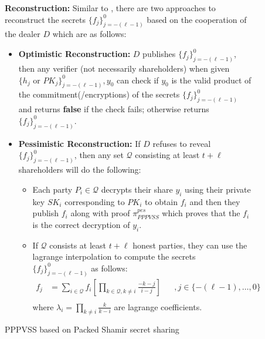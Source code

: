 \begin{figure}[ht]
{\begin{tcolorbox}[title=\textbf{PPPVSS based on Packed Shamir secret sharing \ref{sec:packed-shamir}}, width=1.2\textwidth, colframe=blue!75!black, colback=blue!10, sharp corners]
        \vspace{0.5em}
        \textbf{Reconstruction:}
            Similar to \cite{cryptoeprint:2025/576}, there are two approaches to reconstruct the secrets 
            $\{f_j\}_{j=-(\ell-1)}^0$ based on the cooperation of the dealer $D$ which are as follows:
            \begin{itemize}
                \item \textbf{Optimistic Reconstruction:} $D$ publishes $\{f_j\}_{j=-(\ell-1)}^0$, then any verifier (not necessarily shareholders) 
                when given $\{h_j\text{ or }PK_j\}_{j=-(\ell-1)}^0,y_0$ can check if $y_0$ is the valid product of the commitment(/encryptions) 
                of the secrets $\{f_j\}_{j=-(\ell-1)}^0$ and returns \textbf{false} if the check fails; otherwise returns 
                $\{f_j\}_{j=-(\ell-1)}^0$.
                \item \textbf{Pessimistic Reconstruction:} If $D$ refuses to reveal $\{f_j\}_{j=-(\ell-1)}^0$, then any set 
                $\mathcal{Q}$ consisting at least $t+\ell$ shareholders will do the following:
                \begin{itemize}
                    \item Each party $P_i\in\mathcal{Q}$ decrypts their share $y_i$ using their private key $SK_i$ 
                      corresponding to $PK_i$ to obtain $f_i$ and then they publish $f_i$ 
                      along with proof $\pi_{PPPVSS}^{pes}$ which proves that the $f_i$ is the correct 
                      decryption of $y_i$.
                    \item If $\mathcal{Q}$ consists at least $t+\ell$ honest parties, they can use the 
                    lagrange interpolation to compute the secrets $\{f_j\}_{j=-(\ell-1)}^0$ as follows:
                    \begin{align*}
                        f_j &= \sum_{i\in \mathcal{Q}} f_i \left[\prod_{k\in \mathcal{Q}, k\neq i}\frac{-k-j}{i-j}\right] &&, j\in\{-(\ell-1),\dots,0\} \\
                    \end{align*}
                    where $\lambda_i=\prod_{k\neq i}\frac{k}{k-i}$ are lagrange coefficients.
                \end{itemize}
            \end{itemize}
    \end{tcolorbox}
    }
    \caption[PPPVSS Scheme]{PPPVSS based on Packed Shamir secret sharing}
    \label{fig:packed-shamir-PPPVSS}
\end{figure}